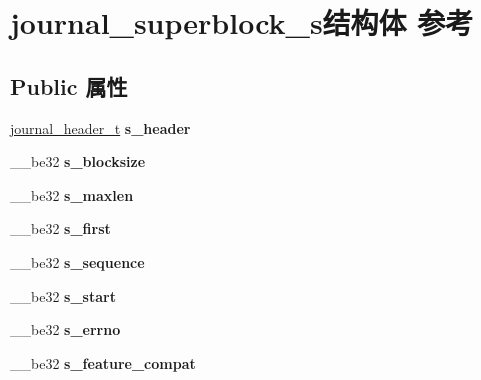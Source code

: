 \hypertarget{structjournal__superblock__s}{}\section{journal\+\_\+superblock\+\_\+s结构体 参考}
\label{structjournal__superblock__s}
\subsection*{Public 属性}
\begin{DoxyCompactItemize}
\item 
\mbox{\label{structjournal__superblock__s_afd224e158383fa3524b00a57ec882d30}} 
\hyperlink{structjournal__header__s}{journal\+\_\+header\+\_\+t} {\bfseries s\+\_\+header}
\item 
\mbox{\label{structjournal__superblock__s_a93f0593f298f9df05b906602a791912e}} 
\+\_\+\+\_\+be32 {\bfseries s\+\_\+blocksize}
\item 
\mbox{\label{structjournal__superblock__s_a808a74a200045d8ff98f46df8a40fff5}} 
\+\_\+\+\_\+be32 {\bfseries s\+\_\+maxlen}
\item 
\mbox{\label{structjournal__superblock__s_a45e80ba426faf07934b6b71ce62ee97a}} 
\+\_\+\+\_\+be32 {\bfseries s\+\_\+first}
\item 
\mbox{\label{structjournal__superblock__s_a2df84c5c902e1ed5641f4d2aee4cab73}} 
\+\_\+\+\_\+be32 {\bfseries s\+\_\+sequence}
\item 
\mbox{\label{structjournal__superblock__s_a8dbe8c4b13f251191b693b7cda330257}} 
\+\_\+\+\_\+be32 {\bfseries s\+\_\+start}
\item 
\mbox{\label{structjournal__superblock__s_a0a018c710edf680ed62564de11151765}} 
\+\_\+\+\_\+be32 {\bfseries s\+\_\+errno}
\item 
\mbox{\label{structjournal__superblock__s_a74554f07a838bebbb869674c617eabe2}} 
\+\_\+\+\_\+be32 {\bfseries s\+\_\+feature\+\_\+compat}

\end{DoxyCompactItemize}

